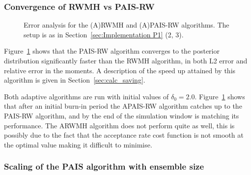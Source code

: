 \documentclass[final]{siamltex}
\begin{document}
\subsubsection{Convergence of RWMH vs PAIS-RW}

\begin{figure}[htb]
\centering
{}
\caption{Error analysis for the (A)RWMH and (A)PAIS-RW algorithms. The setup is as in Section~\ref{sec:Implementation P1} (2, 3).}
\label{fig:MH1 L2}
\end{figure}

Figure~\ref{fig:MH1 L2} shows that the PAIS-RW algorithm converges to the posterior distribution significantly faster than the RWMH algorithm, in both L2 error and relative error in the moments. A description of the speed up attained by this algorithm is given in Section~\ref{sec:calc_saving}.

Both adaptive algorithms are run with initial values of $\delta_0=2.0$. Figure~\ref{fig:MH1 L2} shows that after an initial burn-in period the APAIS-RW algorithm catches up to the PAIS-RW algorithm, and by the end of the simulation window is matching its performance. The ARWMH algorithm does not perform quite as well, this is possibly due to the fact that the acceptance rate cost function is not smooth at the optimal value making it difficult to minimise.

\subsubsection{Scaling of the PAIS algorithm with ensemble size}
\end{document}
